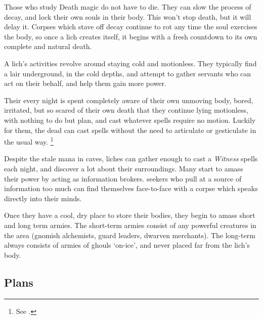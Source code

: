 \begin{multicols}{2}

\noindent
Those who study Death magic do not have to die.
They can slow the process of decay, and lock their own souls in their body.
This won't stop death, but it will delay it.
Corpses which stave off decay continue to rot any time the soul exercises the body, so once a lich creates itself, it begins with a fresh countdown to its own complete and natural death.

A lich's activities revolve around staying cold and motionless.
They typically find a lair underground, in the cold depths, and attempt to gather servants who can act on their behalf, and help them gain more power.

Their every night is spent completely aware of their own unmoving body, bored, irritated, but so scared of their own death that they continue lying motionless, with nothing to do but plan, and cast whatever spells require no motion.
Luckily for them, the dead can cast spells without the need to articulate or gesticulate in the usual way.%
\footnote{See .}

Despite the stale mana in caves, liches can gather enough to cast a \textit{Witness} spells each night, and discover a lot about their surroundings.
Many start to amass their power by acting as information brokers.
\Glspl{seeker} who pull at a source of information too much can find themselves face-to-face with a corpse which speaks directly into their minds.

\lich

Once they have a cool, dry place to store their bodies, they begin to amass short and long term armies.
The short-term armies consist of any powerful creatures in the area (gnomish alchemists, \gls{guard} leaders, dwarven merchants).
The long-term always consists of armies of ghouls `on-ice', and never placed far from the lich's body.

\showStdSpells

\subsection{Plans}


\end{multicols}
